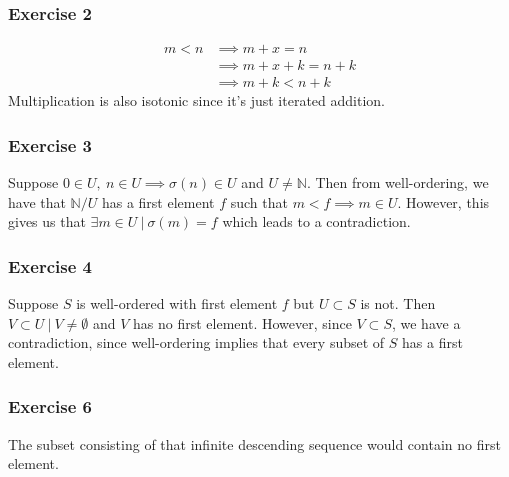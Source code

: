\subsubsection{Exercise 2}
 \begin{align*}
         m < n &\implies m + x = n \\
               &\implies m + x + k = n + k \\
               &\implies m + k < n + k
\end{align*}
Multiplication is also isotonic since it's just iterated addition.

\subsubsection{Exercise 3}
Suppose $0 \in U, \: n \in U \implies \sigma(n) \in U$ and $U \neq \mathbb{N}$.
Then from well-ordering, we have that $\mathbb{N} / U$ has a first element $f$ 
such that $m < f \implies m \in U$. However, this gives us that
$\exists m \in  U \: | \: \sigma(m) = f$ which leads to a contradiction.

\subsubsection{Exercise 4}
Suppose $S$ is well-ordered with first element $f$ but $U \subset S$ is not.
Then $V \subset U \: | \: V \neq \emptyset$ and $V$ has no first element.
However, since $V \subset S$, we have a contradiction, since well-ordering
implies that every subset of $S$ has a first element.

\subsubsection{Exercise 6}
The subset consisting of that infinite descending sequence would contain no
first element.
